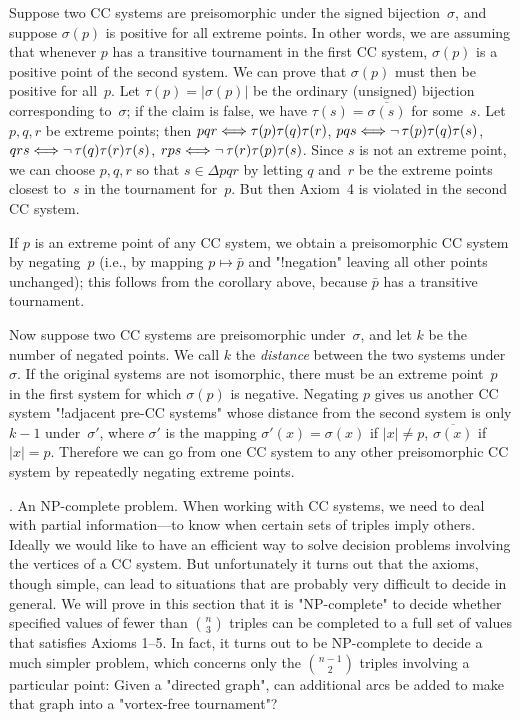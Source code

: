 Suppose two CC systems are preisomorphic under the signed
bijection~$\sigma$, and suppose $\sigma(p)$ is positive for all
extreme points. In other words, we are assuming that whenever $p$ has a
transitive tournament in the first CC system, $\sigma(p)$ is a
positive point of the second system. We can prove that  $\sigma(p)$
must then be positive for all~$p$. Let $\tau(p)=\vert \sigma(p)\vert$
be the ordinary (unsigned) bijection corresponding to~$\sigma$; if
the claim is false, we have $\tau(s)=\overline{\sigma(s)}$ for
some~$s$. Let $p,q,r$ be extreme points; then 
$pqr\Longleftrightarrow\tau(p)\tau(q)\tau(r)$,
$pqs\Longleftrightarrow\neg\,\tau(p)\tau(q)\tau(s)$,
$qrs\Longleftrightarrow\neg\,\tau(q)\tau(r)\tau(s)$,
$rps\Longleftrightarrow\neg\,\tau(r)\tau(p)\tau(s)$.
Since $s$ is not an extreme point, we can choose $p,q,r$ so that
$s\in\Delta pqr$ by letting $q$ and~$r$ be the extreme points closest
to~$s$ in the tournament for~$p$. But then Axiom~4 is violated 
in the second CC system.

If $p$ is an extreme point of any CC system, we obtain a preisomorphic
CC system by negating~$p$ (i.e., by mapping $p\mapsto\bar{p}$ and
"!negation"
leaving all other points unchanged); this follows from the corollary
above, because $\bar{p}$ has a transitive tournament.

Now suppose two CC systems are preisomorphic under~$\sigma$, and let
$k$ be the number of negated points. We call $k$ the {\it distance\/}
between the two systems under~$\sigma$. If the original systems are
not isomorphic, there must be an extreme point~$p$ in the first system for
which $\sigma(p)$ is negative. Negating $p$ gives us another CC system
"!adjacent pre-CC systems"
whose distance from the second system is only $k-1$ under~$\sigma'$,
where $\sigma'$ is the mapping $\sigma'(x)=\sigma(x)$ if $\vert
x\vert\neq p$, $\overline{\sigma(x)}$ if $\vert x\vert=p$. Therefore
we can go from one CC system to any other preisomorphic CC system
by repeatedly negating extreme points.

. An NP-complete problem.
When working with CC systems, we need to deal with partial
information---to know when certain sets of triples imply others.
Ideally we would like to have an efficient way to solve decision problems
involving the vertices of a CC system. But unfortunately it turns out that the
axioms, though simple, can lead to situations that are probably very
difficult to decide in general. We will prove in this section that it
is "NP-complete" to decide whether specified values of fewer than
${n\choose 3}$ triples can be completed to a full set of values that
satisfies Axioms 1--5. In fact, it turns out to be NP-complete to
decide a much simpler problem, which concerns only the ${n-1\choose
2}$ triples involving a particular point: Given a "directed graph", can
additional arcs be added to make that graph into a "vortex-free
tournament"?

